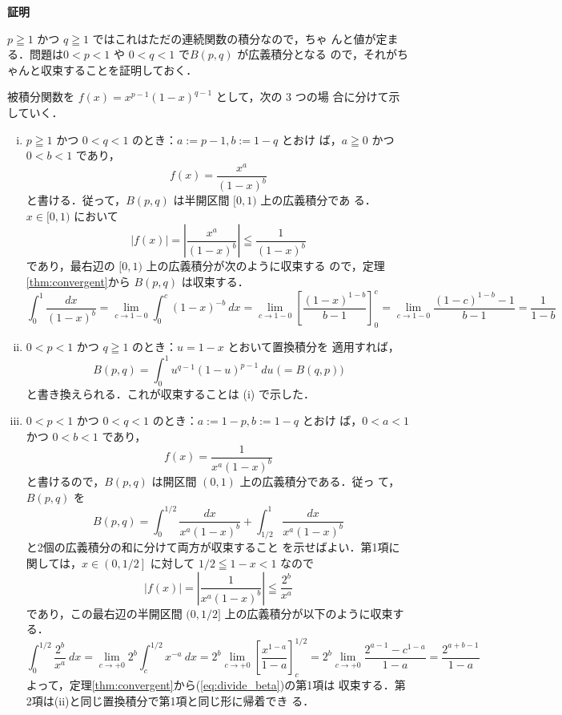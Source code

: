 \documentclass[10pt, uplatex, dvipdfmx]{jsarticle}
\makeatletter
\renewenvironment{proof}[1][\proofname]{\par
  \pushQED{\qed}%
  \normalfont \topsep6\p@\@plus6\p@\relax
  \trivlist
  \item\relax
  {\bfseries
  #1\@addpunct{.}}\hspace\labelsep\ignorespaces
}{%
  \popQED\endtrivlist\@endpefalse
}
\theoremstyle{definition}
\renewcommand{\proofname}{\textbf{証明}}
\numberwithin{equation}{section}
\newcommand{\ds}{\displaystyle}
\makeatother
\begin{document}
\begin{proof}
  $p \geqq 1$ かつ $q \geqq 1$ ではこれはただの連続関数の積分なので，ちゃ
  んと値が定まる．問題は$0<p<1$ や $0<q<1$ で$B(p,q)$ が広義積分となる
  ので，それがちゃんと収束することを証明しておく．

  被積分関数を $\ds f(x) = x^{p-1}(1-x)^{q-1}$ として，次の $3$ つの場
  合に分けて示していく．
  \begin{enumerate}[(i)]

  \item $p \geqq 1$ かつ $0 < q < 1$ のとき：$a:=p-1, b:=1-q$ とおけ
    ば，$a \geqq 0$ かつ $0 < b < 1$ であり，
    \[
      f(x) = \frac{x^a}{(1-x)^b}
    \]
    と書ける．従って，$B(p,q)$ は半開区間 $[0,1)$ 上の広義積分であ
    る．$x \in [0,1)$ において
    \[
      |f(x)| = \left|\frac{x^a}{(1-x)^b}\right| \leqq \frac{1}{(1-x)^b}
    \]
    であり，最右辺の $[0,1)$ 上の広義積分が次のように収束する
    ので，定理\ref{thm:convergent}から $B(p,q)$ は収束する．
    \[
      \int_{0}^{1} \frac{dx}{(1-x)^b} = \lim_{c \to 1-0} \int_{0}^{c} (1-x)^{-b} \ dx
      = \lim_{c \to 1-0} \left[ \frac{(1-x)^{1-b}}{b-1}\right]_{0}^{c}
      =\lim_{c \to 1-0} \frac{ (1-c)^{1-b} - 1}{b-1} = \frac{1}{1-b}
    \]
    
  \item $0 < p < 1$ かつ $q \geqq 1$ のとき：$u=1-x$ とおいて置換積分を
    適用すれば，
    \[
      B(p,q) = \int_{0}^{1}  u^{q-1} (1-u)^{p-1} \ du \; \Big( = B(q,p) \Big)
    \]
    と書き換えられる．これが収束することは (i) で示した．
    
  \item $0 < p < 1$ かつ $0 < q < 1$ のとき：$a:=1-p, b:=1-q$ とおけ
    ば，$0<a<1$ かつ $0<b<1$ であり，
    \[
      f(x) = \frac{1}{x^a (1-x)^b}
    \]
    と書けるので，$B(p,q)$ は開区間 $(0,1)$ 上の広義積分である．従っ
    て，$B(p,q)$ を
    \begin{equation}\label{eq:divide_beta}
      B(p,q) = \int_{0}^{1/2} \frac{dx}{x^a(1-x)^b} + \int_{1/2}^{1} \frac{dx}{x^a (1-x)^b}
    \end{equation}
    と2個の広義積分の和に分けて両方が収束すること
    を示せばよい．第1項に関しては，$\ds x \in \left( 0, 1/2\right]$ に対して $1/2 \leqq 1-x < 1$ なので
    \[
      |f(x)| = \left| \frac{1}{x^a(1-x)^b} \right| \leqq \frac{2^b}{x^a}
    \]
    であり，この最右辺の半開区間 $(0, 1/2]$ 上の広義積分が以下のように収束する．
    \[
      \int_{0}^{1/2} \frac{2^b}{x^a} \ dx = \lim_{ c \to +0} 2^b
      \int_{c}^{1/2} x^{-a} \ dx = 2^b \lim_{ c \to +0}
      \left[\frac{x^{1-a}}{1-a}\right]_{c}^{1/2} = 2^b
      \lim_{c \to +0} \frac{2^{a-1} - c^{1-a}}{1-a} = \frac{2^{a+b-1}}{1-a}
    \]
    よって，定理\ref{thm:convergent}から(\ref{eq:divide_beta})の第1項は
    収束する．第2項は(ii)と同じ置換積分で第1項と同じ形に帰着でき
    る．\qedhere
  \end{enumerate}
\end{proof}
\end{document}
